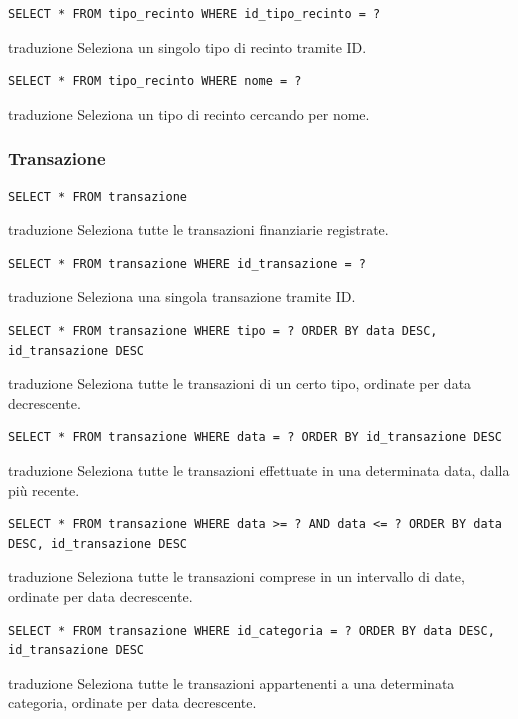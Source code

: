 \documentclass[12pt,a4paper]{report}
\begin{document}
\begin{lstlisting}[style=sqlstyle]
SELECT * FROM tipo_recinto WHERE id_tipo_recinto = ?
\end{lstlisting}
traduzione {Seleziona un singolo tipo di recinto tramite ID.}

\begin{lstlisting}[style=sqlstyle]
SELECT * FROM tipo_recinto WHERE nome = ?
\end{lstlisting}
traduzione {Seleziona un tipo di recinto cercando per nome.}

\subsubsection*{Transazione}
\begin{lstlisting}[style=sqlstyle]
SELECT * FROM transazione
\end{lstlisting}
traduzione {Seleziona tutte le transazioni finanziarie registrate.}

\begin{lstlisting}[style=sqlstyle]
SELECT * FROM transazione WHERE id_transazione = ?
\end{lstlisting}
traduzione {Seleziona una singola transazione tramite ID.}

\begin{lstlisting}[style=sqlstyle]
SELECT * FROM transazione WHERE tipo = ? ORDER BY data DESC, id_transazione DESC
\end{lstlisting}
traduzione {Seleziona tutte le transazioni di un certo tipo, ordinate per data decrescente.}

\begin{lstlisting}[style=sqlstyle]
SELECT * FROM transazione WHERE data = ? ORDER BY id_transazione DESC
\end{lstlisting}
traduzione {Seleziona tutte le transazioni effettuate in una determinata data, dalla più recente.}

\begin{lstlisting}[style=sqlstyle]
SELECT * FROM transazione WHERE data >= ? AND data <= ? ORDER BY data DESC, id_transazione DESC
\end{lstlisting}
traduzione {Seleziona tutte le transazioni comprese in un intervallo di date, ordinate per data decrescente.}

\begin{lstlisting}[style=sqlstyle]
SELECT * FROM transazione WHERE id_categoria = ? ORDER BY data DESC, id_transazione DESC
\end{lstlisting}
traduzione {Seleziona tutte le transazioni appartenenti a una determinata categoria, ordinate per data decrescente.}
\end{document}
